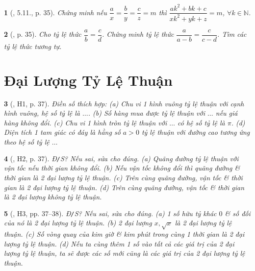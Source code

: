 \documentclass{article}
\newtheorem{baitoan}{}
\begin{document}
\begin{baitoan}[\cite{Binh_boi_duong_Toan_7_tap_1}, 5.11., p. 35]
	Chứng minh nếu $\dfrac{a}{x} = \dfrac{b}{y} = \dfrac{c}{z} = m$ thì $\dfrac{ak^2 + bk + c}{xk^2 + yk + z} = m$, $\forall k\in\mathbb{N}$.
\end{baitoan}

\begin{baitoan}[\cite{Binh_boi_duong_Toan_7_tap_1}, p. 35]
	Cho tỷ lệ thức $\dfrac{a}{b} = \dfrac{c}{d}$. Chứng minh tỷ lệ thức $\dfrac{a}{a - b} = \dfrac{c}{c - d}$. Tìm các tỷ lệ thức tương tự.
\end{baitoan}


\section{Đại Lượng Tỷ Lệ Thuận}

\begin{baitoan}[\cite{Binh_boi_duong_Toan_7_tap_1}, H1, p. 37]
	Điền số thích hợp: (a) Chu vi 1 hình vuông tỷ lệ thuận với cạnh hình vuông, hệ số tỷ lệ là $\ldots$. (b) Số hàng mua được tỷ lệ thuận với $\ldots$ nếu giá hàng không đổi. (c) Chu vi 1 hình tròn tỷ lệ thuận với $\ldots$ có hệ số tỷ lệ là $\pi$. (d) Diện tích 1 tam giác có đáy là hằng số $a > 0$ tỷ lệ thuận với đường cao tương ứng theo hệ số tỷ lệ $\ldots$
\end{baitoan}

\begin{baitoan}[\cite{Binh_boi_duong_Toan_7_tap_1}, H2, p. 37]
	{\rm Đ{\tt/}S?} Nếu sai, sửa cho đúng. (a) Quãng đường tỷ lệ thuận với vận tốc nếu thời gian không đổi. (b) Nếu vận tốc không đổi thì quãng đường \& thời gian là 2 đại lượng tỷ lệ thuận. (c) Trên cùng quãng đường, vận tốc \& thời gian là 2 đại lượng tỷ lệ thuận. (d) Trên cùng quãng đường, vận tốc \& thời gian là 2 đại lượng không tỷ lệ thuận.
\end{baitoan}

\begin{baitoan}[\cite{Binh_boi_duong_Toan_7_tap_1}, H3, pp. 37--38]
	{\rm Đ{\tt/}S?} Nếu sai, sửa cho đúng. (a) 1 số hữu tỷ khác $0$ \& số đối của nó là 2 đại lượng tỷ lệ thuận. (b) 2 đại lượng $x,\sqrt{x}$ là 2 đại lượng tỷ lệ thuận. (c) Số vòng quay của kim giờ \& kim phút trong cùng 1 thời gian là 2 đại lượng tỷ lệ thuận. (d) Nếu ta cùng thêm 1 số vào tất cả các giá trị của 2 đại lượng tỷ lệ thuận, ta sẽ được các số mới cũng là các giá trị của 2 đại lượng tỷ lệ thuận.
\end{baitoan}
\end{document}
